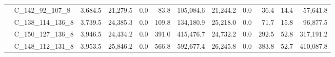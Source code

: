 \begin{table}[htb]
\begin{tabular}{llrrrrrrrrrr}
 & C_142_92_107_8 & 3,684.5 & 21,279.5 & 0.0 & 83.8 & 105,084.6 & 21,244.2 & 0.0 & 36.4 & 14.4 & 57,641.8 \\
 & C_138_114_136_8 & 3,739.5 & 24,385.3 & 0.0 & 109.8 & 134,180.9 & 25,218.0 & 0.0 & 71.7 & 15.8 & 96,877.5 \\
 & C_150_127_136_8 & 3,946.5 & 24,434.2 & 0.0 & 391.0 & 415,476.7 & 24,732.2 & 0.0 & 292.5 & 52.8 & 317,191.2 \\
 & C_148_112_131_8 & 3,953.5 & 25,846.2 & 0.0 & 566.8 & 592,677.4 & 26,245.8 & 0.0 & 383.8 & 52.7 & 410,087.8 \\
\bottomrule
\end{tabular}
\end{table}
